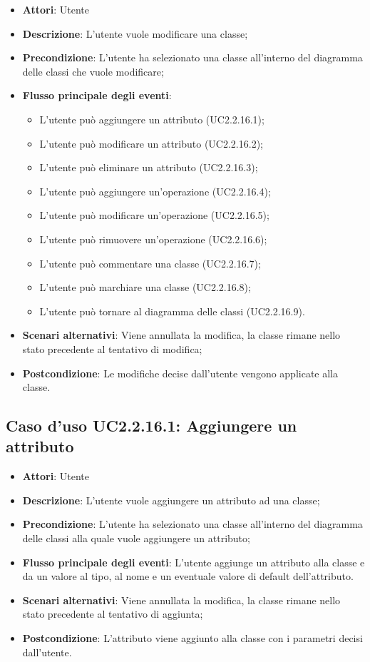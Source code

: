 \documentclass[../AnalisiDeiRequisiti.tex]{subfiles}
\begin{document}
			\begin{itemize}
				\item \textbf{Attori}: Utente
				\item \textbf{Descrizione}: L'utente vuole modificare una classe;
				\item \textbf{Precondizione}: L'utente ha selezionato una classe all'interno del diagramma delle classi che vuole modificare;
				\item \textbf{Flusso principale degli eventi}: \begin{itemize}
					\item L'utente può aggiungere un attributo (UC2.2.16.1);
					\item L'utente può modificare un attributo (UC2.2.16.2);
					\item L'utente può eliminare un attributo (UC2.2.16.3);
					\item L'utente può aggiungere un'operazione (UC2.2.16.4);
					\item L'utente può modificare un'operazione (UC2.2.16.5);
					\item L'utente può rimuovere un'operazione (UC2.2.16.6);
					\item L'utente può commentare una classe (UC2.2.16.7);
					\item L'utente può marchiare una classe (UC2.2.16.8);
					\item L'utente può tornare al diagramma delle classi (UC2.2.16.9).
				\end{itemize}
				\item \textbf{Scenari alternativi}: Viene annullata la modifica, la classe rimane nello stato precedente al tentativo di modifica;
				\item \textbf{Postcondizione}: Le modifiche decise dall'utente vengono applicate alla classe.
			\end{itemize}
			\subsection{Caso d'uso UC2.2.16.1: Aggiungere un attributo}
			\begin{itemize}
				\item \textbf{Attori}: Utente
				\item \textbf{Descrizione}: L'utente vuole aggiungere un attributo ad una classe;
				\item \textbf{Precondizione}: L'utente ha selezionato una classe all'interno del diagramma delle classi alla quale vuole aggiungere un attributo;
				\item \textbf{Flusso principale degli eventi}: L'utente aggiunge un attributo alla classe e da un valore al tipo, al nome e un eventuale valore di default dell'attributo. 
				\item \textbf{Scenari alternativi}: Viene annullata la modifica, la classe rimane nello stato precedente al tentativo di aggiunta;
				\item \textbf{Postcondizione}: L'attributo viene aggiunto alla classe con i parametri decisi dall'utente.
			\end{itemize}
\end{document}
